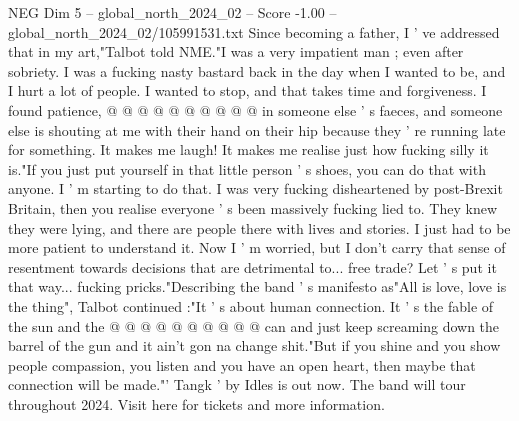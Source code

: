 \begin{textsample}{NEG Dim 5 – global\_north\_2024\_02 – Score -1.00 – global\_north\_2024\_02/105991531.txt}
Since becoming a father, I ' ve addressed that in my art,"Talbot told NME."I was a very impatient man ; even after sobriety.
I was a fucking nasty bastard back in the day when I wanted to be, and I hurt a lot of people.
I wanted to stop, and that takes time and forgiveness.
I found patience, @ @ @ @ @ @ @ @ @ @ in someone else ' s faeces, and someone else is shouting at me with their hand on their hip because they ' re running late for something.
It makes me laugh!
It makes me realise just how fucking silly it is."If you just put yourself in that little person ' s shoes, you can do that with anyone.
I ' m starting to do that.
I was very fucking disheartened by post-Brexit Britain, then you realise everyone ' s been massively fucking lied to.
They knew they were lying, and there are people there with lives and stories.
I just had to be more patient to understand it.
Now I ' m worried, but I don't carry that sense of resentment towards decisions that are detrimental to... free trade?
Let ' s put it that way... fucking pricks."Describing the band ' s manifesto as"All is love, love is the thing", Talbot continued :"It ' s about human connection.
It ' s the fable of the sun and the @ @ @ @ @ @ @ @ @ @ can and just keep screaming down the barrel of the gun and it ain't gon na change shit."But if you shine and you show people compassion, you listen and you have an open heart, then maybe that connection will be made."' Tangk ' by Idles is out now.
The band will tour throughout 2024.
Visit here for tickets and more information.

\end{textsample}
